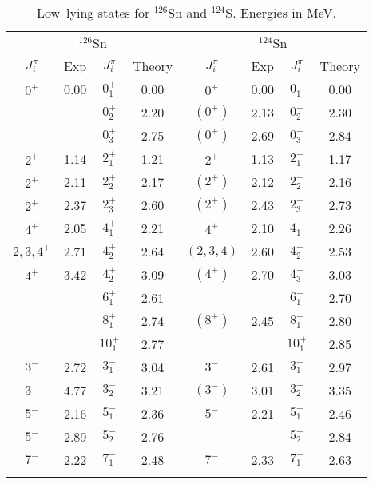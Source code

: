 \begin{table}[htbp]
\begin{center}
\begin{tabular}{cccc|cccc}
\hline
\multicolumn{4}{c}{ $^{126}$Sn} & \multicolumn{4}{c}{ $^{124}$Sn} \\ 
{$J^{\pi}_i$} & {Exp} & {$J^{\pi}_i$} & {Theory} & 
{$J^{\pi}_i$} & {Exp} & {$J^{\pi}_i$} & {Theory} \\
\hline 
$0^{+}$ & 0.00 & $0^{+}_{1}$ & 0.00 &
  $0^{+}$   & 0.00 & $0^{+}_{1}$ & 0.00 \\
            &      & $0^{+}_{2}$ & 2.20 &
$(0^{+})$ & 2.13 & $0^{+}_{2}$ & 2.30 \\
            &      & $0^{+}_{3}$ & 2.75 &
$(0^{+})$ & 2.69 & $0^{+}_{3}$ & 2.84 \\
$2^{+}$ & 1.14 & $2^{+}_{1}$ & 1.21 &
  $2^{+}  $ & 1.13 & $2^{+}_{1}$ & 1.17 \\
$2^{+}$ & 2.11 & $2^{+}_{2}$ & 2.17 &
   $(2^{+})$ & 2.12 & $2^{+}_{2}$ & 2.16 \\
$2^{+}$ & 2.37 & $2^{+}_{3}$ & 2.60 &
  $(2^{+})$ & 2.43 & $2^{+}_{3}$ & 2.73 \\
$4^{+}$     & 2.05 & $4^{+}_{1}$ & 2.21 &
  $4^{+}  $ & 2.10 & $4^{+}_{1}$ & 2.26 \\
$2,3,4^{+}$ & 2.71 & $4^{+}_{2}$ & 2.64 &
  $(2,3,4)$ & 2.60 & $4^{+}_{2}$ & 2.53 \\
$4^{+}$     & 3.42 & $4^{+}_{2}$ & 3.09 &
  $(4^{+})$ & 2.70 & $4^{+}_{3}$ & 3.03 \\
            &      & $6^{+}_{1}$ & 2.61 &
            &      & $6^{+}_{1}$ & 2.70 \\
            &      & $8^{+}_{1}$ & 2.74 &
  $(8^{+})$ & 2.45 & $8^{+}_{1}$ & 2.80 \\
            &     & $10^{+}_{1}$ & 2.77 &
            &     & $10^{+}_{1}$ & 2.85 \\
$3^{-}$ & 2.72 & $3^{-}_{1}$ & 3.04 &
  $3^{-}$ & 2.61 & $3^{-}_{1}$ & 2.97 \\
$3^{-}$ & 4.77 & $3^{-}_{2}$ & 3.21 &
  $(3^{-})$ & 3.01 & $3^{-}_{2}$ & 3.35 \\
$5^{-}$ & 2.16 & $5^{-}_{1}$ & 2.36 &
 $5^{-}$ & 2.21 & $5^{-}_{1}$ & 2.46 \\
$5^{-}$ & 2.89 & $5^{-}_{2}$ & 2.76 &
         &      & $5^{-}_{2}$ & 2.84 \\
$7^{-}$ & 2.22 & $7^{-}_{1}$ & 2.48 &
 $7^{-}$ & 2.33 & $7^{-}_{1}$ & 2.63 \\
&&&\\ \hline
\end{tabular}
\caption{Low--lying states for  $^{126}$Sn and $^{124}$S. Energies in MeV.}
\label{tab:sn126}
\end{center}
\end{table}




